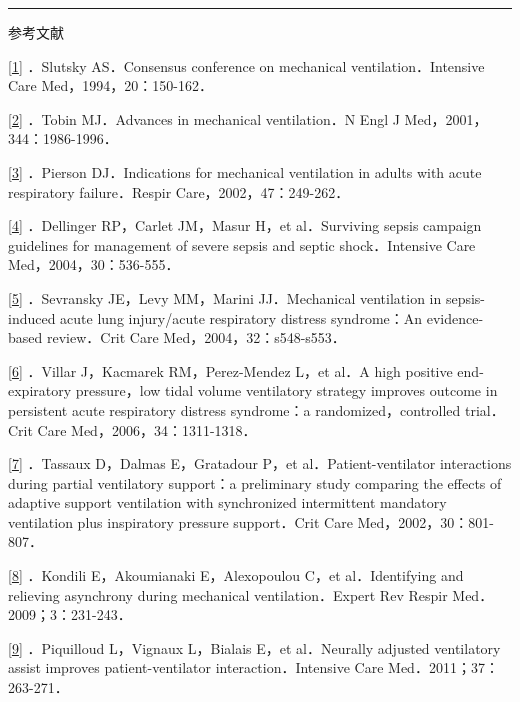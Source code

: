 \begin{center}\rule{0.5\linewidth}{\linethickness}\end{center}

参考文献

\protect\hyperlink{text00016.htmlux5cux23ch1-15-back}{{[}1{]}} ．Slutsky
AS．Consensus conference on mechanical ventilation．Intensive Care
Med，1994，20：150-162．

\protect\hyperlink{text00016.htmlux5cux23ch2-15-back}{{[}2{]}} ．Tobin
MJ．Advances in mechanical ventilation．N Engl J
Med，2001，344：1986-1996．

\protect\hyperlink{text00016.htmlux5cux23ch3-15-back}{{[}3{]}} ．Pierson
DJ．Indications for mechanical ventilation in adults with acute
respiratory failure．Respir Care，2002，47：249-262．

\protect\hyperlink{text00016.htmlux5cux23ch4-15-back}{{[}4{]}}
．Dellinger RP，Carlet JM，Masur H，et al．Surviving sepsis campaign
guidelines for management of severe sepsis and septic shock．Intensive
Care Med，2004，30：536-555．

\protect\hyperlink{text00016.htmlux5cux23ch5-15-back}{{[}5{]}}
．Sevransky JE，Levy MM，Marini JJ．Mechanical ventilation in
sepsis-induced acute lung injury/acute respiratory distress syndrome：An
evidence-based review．Crit Care Med，2004，32：s548-s553．

\protect\hyperlink{text00016.htmlux5cux23ch6-15-back}{{[}6{]}} ．Villar
J，Kacmarek RM，Perez-Mendez L，et al．A high positive end-expiratory
pressure，low tidal volume ventilatory strategy improves outcome in
persistent acute respiratory distress syndrome：a randomized，controlled
trial．Crit Care Med，2006，34：1311-1318．

\protect\hyperlink{text00016.htmlux5cux23ch7-15-back}{{[}7{]}} ．Tassaux
D，Dalmas E，Gratadour P，et al．Patient-ventilator interactions during
partial ventilatory support：a preliminary study comparing the effects
of adaptive support ventilation with synchronized intermittent mandatory
ventilation plus inspiratory pressure support．Crit Care
Med，2002，30：801-807．

\protect\hyperlink{text00016.htmlux5cux23ch8-15-back}{{[}8{]}} ．Kondili
E，Akoumianaki E，Alexopoulou C，et al．Identifying and relieving
asynchrony during mechanical ventilation．Expert Rev Respir
Med．2009；3：231-243．

\protect\hyperlink{text00016.htmlux5cux23ch9-15-back}{{[}9{]}}
．Piquilloud L，Vignaux L，Bialais E，et al．Neurally adjusted
ventilatory assist improves patient-ventilator interaction．Intensive
Care Med．2011；37：263-271．

